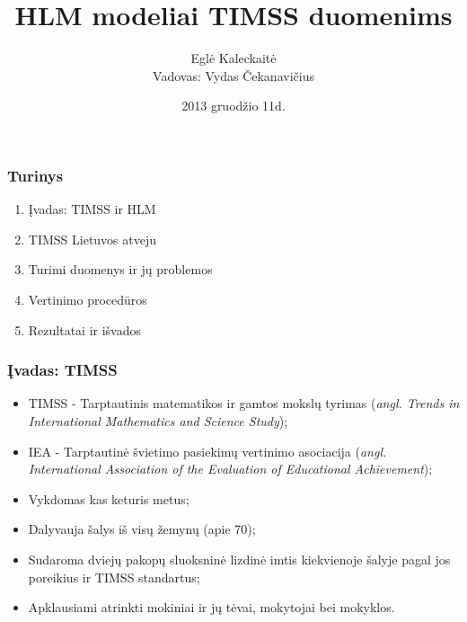 \documentclass[utf8,hyperref={unicode,pdftex}]{beamer}
\title[\hspace{130pt} p. \insertpagenumber\enspace iš \insertdocumentendpage\enspace ]{HLM modeliai TIMSS duomenims}
\author[ E. Kaleckaitė]{Eglė Kaleckaitė\\
Vadovas: Vydas Čekanavičius}
\institute{Vilniaus Universitetas, Matematikos ir Informatikos Fakultetas}
\date{2013 gruodžio 11d.}
\begin{document}
\begin{frame}
\titlepage
\end{frame}
\begin{frame}
\frametitle{Turinys}
\Large
\begin{enumerate}
\item Įvadas: TIMSS ir HLM
\item TIMSS Lietuvos atveju
\item Turimi duomenys ir jų problemos
\item Vertinimo procedūros
\item Rezultatai ir išvados
\end{enumerate}
\end{frame}
\begin{frame}
\frametitle{Įvadas: TIMSS}
\begin{itemize}
\item TIMSS - Tarptautinis matematikos ir gamtos mokslų tyrimas (\textit{angl. Trends in International Mathematics and Science Study});
\item IEA - Tarptautinė švietimo pasiekimų vertinimo asociacija (\textit{angl. International Association of the Evaluation of Educational Achievement});
\item Vykdomas kas keturis metus;
\item Dalyvauja šalys iš visų žemynų (apie 70);
\item Sudaroma dviejų pakopų sluoksninė lizdinė imtis kiekvienoje šalyje pagal jos poreikius ir TIMSS standartus;
\item Apklausiami atrinkti mokiniai ir jų tėvai, mokytojai bei mokyklos.
\end{itemize}
\end{frame}
\end{document}
